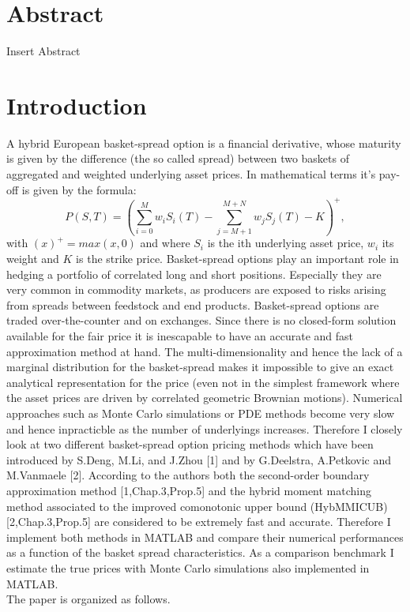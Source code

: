 \documentclass[a4paper]{article}
\begin{document}
\section*{Abstract}
Insert Abstract

\newpage
{}
\setcounter{page}{1}
\renewcommand{\cftsecleader}{\cftdotfill{\cftdotsep}}
\tableofcontents

\newpage
{}
\setcounter{page}{1}
\section{Introduction}
A hybrid European basket-spread option is a financial derivative, whose
maturity is given by the difference (the so called spread) between two 
baskets of aggregated and weighted underlying asset prices. In mathematical terms it's pay-off is given by 
the formula:
\begin{equation}
\label{eq:po}
P(S,T) = (\sum_{i=0}^M w_iS_i(T) - \sum_{j=M+1}^{M+N} w_jS_j(T) - K)^+,
\end{equation}
with $(x)^+=max(x,0)$ and where $S_i$ is the ith underlying asset price, $w_i$ its weight and $K$ is the strike price.
Basket-spread options play an important role in hedging a portfolio of correlated long and short
positions. Especially they are very common in commodity markets,
as producers are exposed to risks arising from spreads between feedstock and end products.
Basket-spread options are traded over-the-counter and on exchanges. Since there is no
closed-form solution available for the fair price it is inescapable to have an accurate and
fast approximation method at hand. The multi-dimensionality and
hence the lack of a marginal distribution for the basket-spread makes it impossible to give an exact
analytical representation for the price (even not in the simplest framework
where the asset prices are driven by  correlated geometric Brownian motions). Numerical approaches such 
as Monte Carlo simulations or PDE methods become very slow and hence inpracticble as the number of underlyings increases. 
Therefore I closely look at two different basket-spread option pricing methods which have been 
introduced by S.Deng, M.Li, and J.Zhou [1] and by G.Deelstra, A.Petkovic and M.Vanmaele [2]. According to the authors both the second-order
boundary approximation method [1,Chap.3,Prop.5] and the hybrid moment matching method associated to the improved comonotonic upper bound (HybMMICUB)
[2,Chap.3,Prop.5] are considered to be extremely fast and accurate. Therefore I implement both methods in MATLAB
and compare their numerical performances as a function of the basket spread characteristics. 
As a comparison benchmark I estimate the true prices with Monte Carlo simulations also implemented in MATLAB.\\
The paper is organized as follows.
\end{document}
